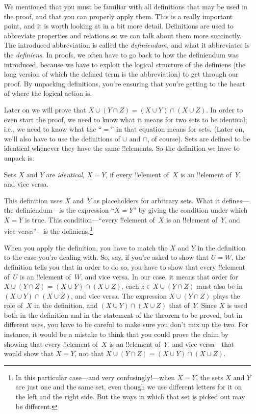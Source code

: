 \documentclass[../../../include/open-logic-section]{subfiles}
\begin{document}


We mentioned that you must be familiar with all definitions that may
be used in the proof, and that you can properly apply them. This is a
really important point, and it is worth looking at in a bit more
detail. Definitions are used to abbreviate properties and relations so
we can talk about them more succinctly. The introduced abbreviation is
called the \emph{definiendum}, and what it abbreviates is the
\emph{definiens}.  In proofs, we often have to go back to how the
definiendum was introduced, because we have to exploit the logical
structure of the definiens (the long version of which the defined term
is the abbreviation) to get through our proof.  By unpacking
definitions, you're ensuring that you're getting to the heart of where
the logical action is.

Later on we will prove that $X \cup (Y \cap Z) = (X \cup Y) \cap (X
\cup Z)$. In order to even start the proof, we need to know what it
means for two sets to be identical; i.e., we need to know what the
``$=$'' in that equation means for sets.  (Later on, we'll also have
to use the definitions of $\cup$ and $\cap$, of course).  Sets are
defined to be identical whenever they have the same !!{element}s.  So
the definition we have to unpack is:

\begin{defn}
Sets $X$ and $Y$ are \emph{identical}, $X = Y$, if every !!{element}
of~$X$ is an !!{element} of~$Y$, and vice versa.
\end{defn}

This definition uses $X$ and~$Y$ as placeholders for arbitrary
sets. What it defines---the definiendum---is the expression ``$X =
Y$'' by giving the condition under which $X = Y$ is true.  This
condition---``every !!{element} of~$X$ is an !!{element} of~$Y$, and
vice versa''---is the definiens.\footnote{In this particular
  case---and very confusingly!---when $X = Y$, the sets $X$ and $Y$
  are just one and the same set, even though we use different letters
  for it on the left and the right side.  But the ways in which that
  set is picked out may be different.}

When you apply the definition, you have to match the $X$ and $Y$ in
the definition to the case you're dealing with.  So, say, if you're
asked to show that $U = W$, the definition tells you that in order to
do so, you have to show that every !!{element} of~$U$ is an
!!{element} of~$W$, and vice versa.  In our case, it means that order
for $X \cup (Y \cap Z) = (X \cup Y) \cap (X \cup Z)$, each $z \in X
\cup (Y \cap Z)$ must also be in $(X \cup Y) \cap (X \cup Z)$, and
vice versa.  The expression $X \cup (Y \cap Z)$ plays the role of~$X$
in the definition, and $(X \cup Y) \cap (X \cup Z)$ that of~$Y$. Since
$X$ is used both in the definition and in the statement of the theorem
to be proved, but in different uses, you have to be careful to make
sure you don't mix up the two.  For instance, it would be a mistake to
think that you could prove the claim by showing that every !!{element}
of~$X$ is an !!{element} of~$Y$, and vice versa---that would show that
$X = Y$, not that $X \cup (Y \cap Z) = (X \cup Y) \cap (X \cup Z)$.
\end{document}
